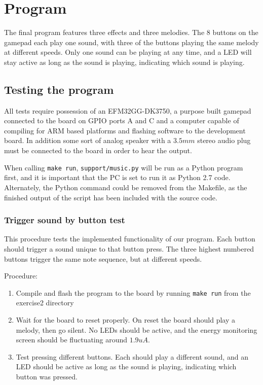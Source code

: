 \section{Program}
The final program features three effects and three melodies. The 8 buttons on the gamepad each play one sound, with three of the buttons playing the same melody at different speeds. Only one sound can be playing at any time, and a LED will stay active as long as the sound is playing, indicating which sound is playing.

\subsection{Testing the program}
All tests require possession of an EFM32GG-DK3750, a purpose built gamepad connected to the board on GPIO ports A and C and a computer capable of compiling for ARM based platforms and flashing software to the development board. In addition some sort of analog speaker with a $3.5mm$ stereo audio plug must be connected to the board in order to hear the output.

When calling \texttt{make run}, \texttt{support/music.py} will be run as a Python program first, and it is important that the PC is set to run it as Python 2.7 code. Alternately, the Python command could be removed from the Makefile, as the finished output of the script has been included with the source code.

\subsubsection{Trigger sound by button test}
This procedure tests the implemented functionality of our program. Each button should trigger a sound unique to that button press. The three highest numbered buttons trigger the same note sequence, but at different speeds.

Procedure:
\begin{enumerate}
    \item   Compile and flash the program to the board by running \texttt{make run} from the exercise2 directory
    \item   Wait for the board to reset properly. On reset the board should play a melody, then go silent. No LEDs should be active, and the energy monitoring screen should be fluctuating around $1.9uA$.
    \item   Test pressing different buttons. Each should play a different sound, and an LED should be active as long as the sound is playing, indicating which button was pressed.
\end{enumerate}

